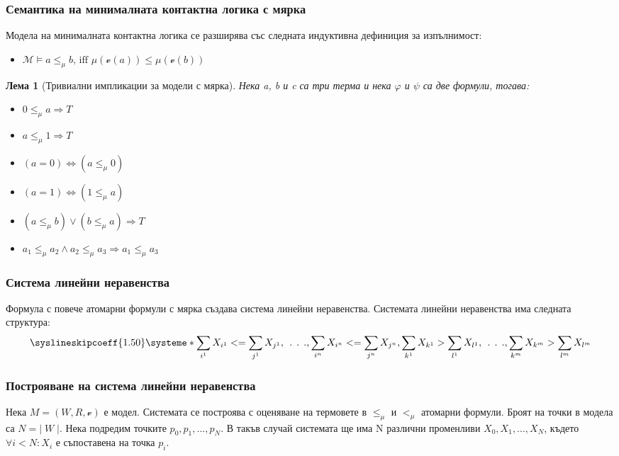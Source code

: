 \documentclass{beamer}
\newtheorem{lema}{Лема}[section]
\newcommand{\vE}{\mathscr{v}}
\begin{document}
\begin{frame}\frametitle{Семантика на минималната контактна логика с мярка}
	Модела на минималната контактна логика се разширява със следната индуктивна дефиниция за изпълнимост:
	\begin{itemize}
		\item $\mathcal{M} \models a \leq_\mu b \text{, iff } \mu(\mathscr{v}(a)) \le \mu(\mathscr{v}(b))$
	\end{itemize}

	\begin{lema}[Тривиални импликации за модели с мярка]
Нека a, b и c са три терма и нека $\varphi$ и $\psi$ са две формули, тогава:
	\begin{itemize}
		\item $0 \le_\mu a \Longrightarrow T$
		\item $a \le_\mu 1 \Longrightarrow T$
		\item $(a = 0) \iff (a \le_\mu 0)$
		\item $(a = 1) \iff (1 \le_\mu a)$
		\item $(a \le_\mu b) \lor (b \le_\mu a) \Longrightarrow T$
		\item $a_1 \le_\mu a_2 \land a_2 \le_\mu a_3 \Longrightarrow a_1 \le_\mu a_3$
	\end{itemize}
\end{lema}
\end{frame}

\begin{frame}\frametitle{Система линейни неравенства}
Формула с повече атомарни формули с мярка създава система линейни неравенства.
\newline
Системата линейни неравенства има следната структура:
		\[
			\syslineskipcoeff{1.50}
			\systeme*{\sum_{i^1} X_{i^1} <= \sum_{j^1} X_{j^1},
				\:\:.\:\:.\:\:.,
				\sum_{i^n} X_{i^n} <= \sum_{j^n} X_{j^n}, 
				\sum_{k^1} X_{k^1} > \sum_{l^1} X_{l^1},
				\:\:.\:\:.\:\:.,
				\sum_{k^m} X_{k^m} > \sum_{l^m} X_{l^m}
				}
		\]
\end{frame}

\begin{frame}\frametitle{Построяване на система линейни неравенства}
Нека $M = (W, R, \vE)$ е модел. Системата се построява с оценяване на термовете в $\le_\mu$ и  $<_\mu$ атомарни формули. 
\newline
Броят на точки в модела са $N = | \; W \; |$. Нека подредим точките $p_0, p_1, ..., p_N$. 
В такъв случай системата ще има N различни променливи $X_0, X_1, ..., X_N$, където $\forall i < N: X_i$ е съпоставена на точка $p_i$.
\end{frame}
\end{document}
